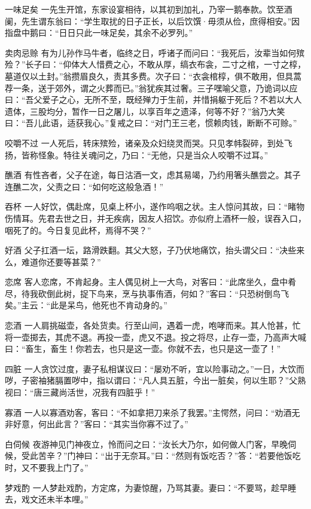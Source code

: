 \documentclass[12pt,UTF8]{ctexbook}
\begin{document}
一味足矣
一先生开馆，东家设宴相待，以其初到加礼，乃宰一鹅奉款。饮至酒阑，先生谓东翁曰：“学生取扰的日子正长，以后饮馔·毋须从俭，庶得相安。”因指盘中鹅曰：“日日只此一味足矣，其余不必罗列。”

卖肉忌赊
有为儿孙作马牛者，临终之日，呼诸子而问曰：“我死后，汝辈当如何殡殓？”长子曰：“仰体大人惜费之心，不敢从厚，缟衣布衾，二寸之棺，一寸之椁，墓道仅以土封。”翁攒眉良久，责其多费。次子曰：“衣衾棺椁，俱不敢用，但具蒿荐一条，送于郊外，谓之火葬而已。”翁犹疾其过奢。三子嘿喻父意，乃诡词以应曰：“吾父爱子之心，无所不至，既经殚力于生前，并惜捐躯于死后？不若以大人遗体，三股均分，暂作一日之屠儿，以享百年之遗泽，何等不好？”翁乃大笑曰：“吾儿此语，适获我心。”复戒之曰：“对门王三老，惯赖肉钱，断断不可赊。”

咬嚼不过
一人死后，转床殡殓，诸亲及众妇绕灵而哭。只见孝帏裂碎，到处飞扬，皆称怪象。特往关魂问之，乃曰：“无他，只是当众人咬嚼不过耳。”

醮酒
有性吝者，父子在途，每日沽酒一文，虑其易竭，乃约用箸头醮尝之。其子连醮二次，父责之曰：“如何吃这般急酒！”

吞杯
一人好饮，偶赴席，见桌上杯小，遂作呜咽之状。主人惊问其故，曰：“睹物伤情耳。先君去世之日，并无疾病，因友人招饮。亦似府上酒杯一般，误吞入口，咽死了的。今日复见此杯，焉得不哭？”

好酒
父子扛酒一坛，路滑跌翻。其父大怒，子乃伏地痛饮，抬头谓父曰：“决些来么，难道你还要等甚菜？”

恋席
客人恋席，不肯起身。主人偶见树上一大鸟，对客曰：“此席坐久，盘中肴尽，待我砍倒此树，捉下鸟来，烹与执事侑酒，何如？”客曰：“只恐树倒鸟飞矣。”主云：“此是呆鸟，他死也不肯动身的。”

恋酒
一人肩挑磁壶，各处货卖。行至山间，遇着一虎，咆哮而来。其人怆甚，忙将一壶掷去，其虎不退。再投一壶，虎又不退。投之将尽，止存一壶，乃高声大喊曰：“畜生，畜生！你若去，也只是这一壶。你就不去，也只是这一壶了！”

四脏
一人贪饮过度，妻子私相谋议曰：“屡劝不听，宜以险事动之。”一日，大饮而哕，子密袖猪膈置哕中，指以谓曰：“凡人具五脏，今出一脏矣，何以生耶？”父熟视曰：“唐三藏尚活世，况我有四脏乎！”

寡酒
一人以寡酒劝客，客曰：“不如拿把刀来杀了我罢。”主愕然，问曰：“劝酒无非好意，何出此言？”客曰：“其实当你寡不过了。”

白伺候
夜游神见门神夜立，怜而问之曰：“汝长大乃尔，如何做人门客，早晚伺候，受此苦辛？”门神曰：“出于无奈耳。”曰：“然则有饭吃否？”答：“若要他饭吃时，又不要我上门了。”

梦戏酌
一人梦赴戏酌，方定席，为妻惊醒，乃骂其妻。妻曰：“不要骂，趁早睡去，戏文还未半本哩。”
\end{document}
